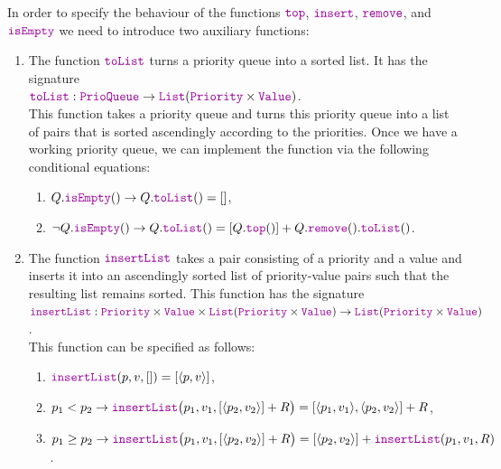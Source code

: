\begin{Definition}
\begin{enumerate}
      In order to specify the behaviour of the functions $\mytt{top}$, $\mytt{insert}$, $\mytt{remove}$,
      and $\mytt{isEmpty}$ we need to introduce two auxiliary functions:  
      \begin{enumerate}
      \item The function $\mytt{toList}$ turns a priority queue into a sorted list.  It has the signature
            \\[0.2cm]
            \hspace*{1.3cm}
            $\mytt{toList}: \mytt{PrioQueue} \rightarrow \mytt{List}(\mytt{Priority} \times \mytt{Value})$.
            \\[0.2cm]
            This function takes a priority queue and turns this priority queue into a list of pairs that is
            sorted ascendingly according to the priorities. Once we have a working priority queue, we can
            implement the function  via the following conditional equations: 
            \begin{enumerate}
            \item $Q.\mytt{isEmpty}() \rightarrow Q.\mytt{toList}() = []$,
            \item $\neg Q.\mytt{isEmpty}() \rightarrow Q.\mytt{toList}() = [Q.\mytt{top}()] + Q.\mytt{remove}().\mytt{toList}()$.
            \end{enumerate}
      \item The function $\mytt{insertList}$ takes a pair consisting of a priority and a value and inserts it
            into an ascendingly sorted list of priority-value pairs such that the resulting list remains
            sorted.  This function has the signature
            \\[0.2cm]
            \hspace*{-0.5cm}
            $\mytt{insertList}: \mytt{Priority} \times \mytt{Value} \times \mytt{List}(\mytt{Priority} \times \mytt{Value}) 
             \rightarrow \mytt{List}(\mytt{Priority} \times \mytt{Value})
            $.
            \\[0.2cm]
            This function can be specified as follows:
            \begin{enumerate}
            \item $\mytt{insertList}(p,v,[]) = [\langle p,v\rangle ]$,
            \item $p_1 <    p_2 \rightarrow \mytt{insertList}\bigl(p_1,v_1,[\pair(p_2,v_2)] + R\bigr) = [\pair(p_1,v_1), \pair(p_2,v_2)] + R$,
            \item $p_1 \geq p_2 \rightarrow \mytt{insertList}\bigl(p_1,v_1,[\pair(p_2,v_2)] + R\bigr) = [\pair(p_2,v_2)] + \mytt{insertList}(p_1,v_1, R)$.

\end{enumerate}
\end{enumerate}
\end{enumerate}
\end{Definition}
